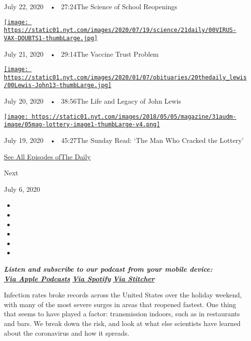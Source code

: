 July 22, 2020~~•~ 27:24The Science of School Reopenings

\href{https://www.nytimes.com/2020/07/21/podcasts/the-daily/coronavirus-vaccine.html?action=click\&module=audio-series-bar\&region=header\&pgtype=Article}{\texttt{[image: https://static01.nyt.com/images/2020/07/19/science/21daily/00VIRUS-VAX-DOUBTS1-thumbLarge.jpg]}}

July 21, 2020~~•~ 29:14The Vaccine Trust Problem

\href{https://www.nytimes.com/2020/07/20/podcasts/the-daily/john-lewis.html?action=click\&module=audio-series-bar\&region=header\&pgtype=Article}{\texttt{[image: https://static01.nyt.com/images/2020/01/07/obituaries/20thedaily\_lewis/00Lewis-John13-thumbLarge.jpg]}}

July 20, 2020~~•~ 38:56The Life and Legacy of John Lewis

\href{https://www.nytimes.com/2020/07/19/podcasts/the-daily/lottery-winner-scam.html?action=click\&module=audio-series-bar\&region=header\&pgtype=Article}{\texttt{[image: https://static01.nyt.com/images/2018/05/05/magazine/31audm-image/05mag-lottery-image1-thumbLarge-v4.png]}}

July 19, 2020~~•~ 45:27The Sunday Read: `The Man Who Cracked the
Lottery'

\href{https://www.nytimes.com/column/the-daily}{See All Episodes ofThe
Daily}

Next

July 6, 2020

\begin{itemize}
\item
\item
\item
\item
\item
\item
\end{itemize}

\emph{\textbf{Listen and subscribe to our podcast from your mobile
device:}}\\
\textbf{\href{https://itunes.apple.com/us/podcast/the-daily/id1200361736?mt=2}{\emph{Via
Apple Podcasts}}} \emph{\textbf{\textbar{}}}
\textbf{\href{https://open.spotify.com/show/3IM0lmZxpFAY7CwMuv9H4g?si=SfuMSC55R1qprFsRZU3_zw}{\emph{Via
Spotify}}} \emph{\textbf{\textbar{}}}
\textbf{\href{http://www.stitcher.com/podcast/the-new-york-times/the-daily-10}{\emph{Via
Stitcher}}}

Infection rates broke records across the United States over the holiday
weekend, with many of the most severe surges in areas that reopened
fastest. One thing that seems to have played a factor: transmission
indoors, such as in restaurants and bars. We break down the risk, and
look at what else scientists have learned about the coronavirus and how
it spreads.

